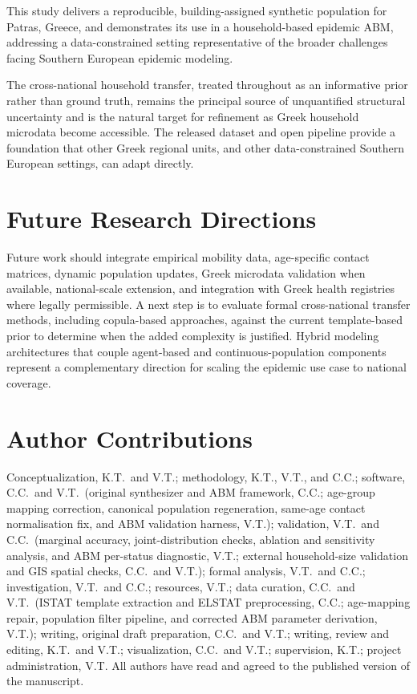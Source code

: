 \documentclass{article}
\begin{document}
This study delivers a reproducible, building-assigned synthetic population for Patras, Greece, and demonstrates its use in a household-based epidemic ABM, addressing a data-constrained setting representative of the broader challenges facing Southern European epidemic modeling.

The cross-national household transfer, treated throughout as an informative prior rather than ground truth, remains the principal source of unquantified structural uncertainty and is the natural target for refinement as Greek household microdata become accessible. The released dataset and open pipeline provide a foundation that other Greek regional units, and other data-constrained Southern European settings, can adapt directly.

\section{Future Research Directions}\label{future-research-directions}

Future work should integrate empirical mobility data, age-specific contact matrices, dynamic population updates, Greek microdata validation when available, national-scale extension, and integration with Greek health registries where legally permissible. A next step is to evaluate formal cross-national transfer methods, including copula-based approaches, against the current template-based prior to determine when the added complexity is justified. Hybrid modeling architectures that couple agent-based and continuous-population components \citep{Kehrer2025} represent a complementary direction for scaling the epidemic use case to national coverage.

\section*{Author Contributions}
Conceptualization, K.T.\ and V.T.; methodology, K.T., V.T., and C.C.;
software, C.C.\ and V.T.\ (original synthesizer and ABM framework, C.C.;
age-group mapping correction, canonical population regeneration, same-age contact
normalisation fix, and ABM validation harness, V.T.);
validation, V.T.\ and C.C.\ (marginal accuracy, joint-distribution checks, ablation and
sensitivity analysis, and ABM per-status diagnostic, V.T.; external household-size
validation and GIS spatial checks, C.C.\ and V.T.);
formal analysis, V.T.\ and C.C.; investigation, V.T.\ and C.C.;
resources, V.T.; data curation, C.C.\ and V.T.\ (ISTAT template extraction and ELSTAT
preprocessing, C.C.; age-mapping repair, population filter pipeline, and corrected ABM
parameter derivation, V.T.);
writing, original draft preparation, C.C.\ and V.T.;
writing, review and editing, K.T.\ and V.T.;
visualization, C.C.\ and V.T.; supervision, K.T.; project administration, V.T.
All authors have read and agreed to the published version of the manuscript.
\end{document}
